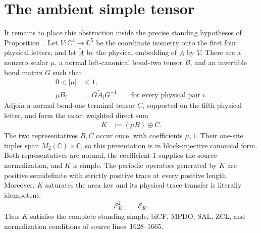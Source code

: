 \documentclass{article}
\begin{document}
\section{The ambient simple tensor}

It remains to place this obstruction inside the precise standing hypotheses
of Proposition~. Let
$V:\mathbb C^4\longrightarrow\mathbb C^5$ be the coordinate isometry onto the
first four physical letters, and let $\widetilde A$ be the physical embedding
of $A$ by $V$. There are a nonzero scalar $\mu$, a normal left-canonical
bond-two tensor $B$, and an invertible bond matrix $G$ such that
\begin{align}
    0<|\mu|&<1,
    \label{eq:cpsv16_prop_c15_blocking_channel_false_weight_bound}\\
    \mu B_i
        &=G\widetilde A_iG^{-1}
        \qquad\text{for every physical pair }i.
    \label{eq:cpsv16_prop_c15_blocking_channel_false_virtual_gauge}
\end{align}
Adjoin a normal bond-one terminal tensor $C$, supported on the fifth physical
letter, and form the exact weighted direct sum
\begin{align}
    K
        &:=(\mu B)\oplus C.
    \label{eq:cpsv16_prop_c15_blocking_channel_false_ambient_tensor}
\end{align}
The two representatives $B,C$ occur once, with coefficients $\mu,1$. Their
one-site tuples span $M_2(\mathbb C)\times\mathbb C$, so this presentation is
in block-injective canonical form. Both representatives are normal, the
coefficient $1$ supplies the source normalization, and $K$ is simple. The
periodic operators generated by $K$ are positive semidefinite with strictly
positive trace at every positive length. Moreover, $K$ saturates the area law
and its physical-trace transfer is literally idempotent:
\begin{align}
    \mathcal E_K^2
        &=\mathcal E_K.
    \label{eq:cpsv16_prop_c15_blocking_channel_false_ambient_zcl}
\end{align}
Thus $K$ satisfies the complete standing simple, biCF, MPDO, SAL, ZCL, and
normalization conditions of source lines~1628--1665.
\end{document}
